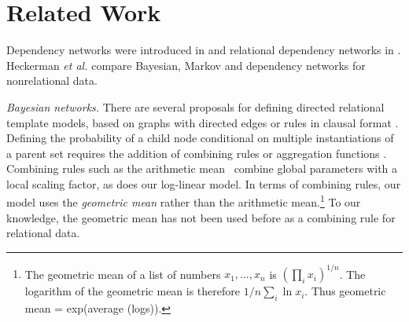 \documentclass[runningheads,a4paper]{llncs}
\begin{document}
 
 
 
 
%

\section{Related Work}
Dependency networks were introduced in \cite{Heckerman2000} and relational dependency networks in \cite{Neville2007}. 
Heckerman {\em et al.} compare Bayesian, Markov and dependency networks for nonrelational data. 

\emph{Bayesian networks.} There are several proposals for defining directed relational template models, based on graphs with directed edges or rules in clausal format \cite{Kersting2007,Getoor2007c}. Defining the probability of a child node conditional on multiple instantiations of a parent set requires the addition of combining rules \cite{Kersting2007} or aggregation functions \cite{Getoor2007c}. 
Combining rules such as the arithmetic mean~\cite{Natarajan2008} combine global parameters with a local scaling factor, as does our log-linear model. In terms of combining rules,  our model uses the {\em geometric mean} rather than the arithmetic mean.\footnote{The geometric mean of a list of numbers $x_{1},\ldots,x_{n}$ is $(\prod_{i} x_{i})^{1/n}$. The logarithm of the geometric mean is therefore $1/n \sum_{i} \ln x_{i}$. Thus geometric mean = exp(average (logs)).} To our knowledge, the geometric mean has not been used before as a combining rule for relational data.  
\end{document}
